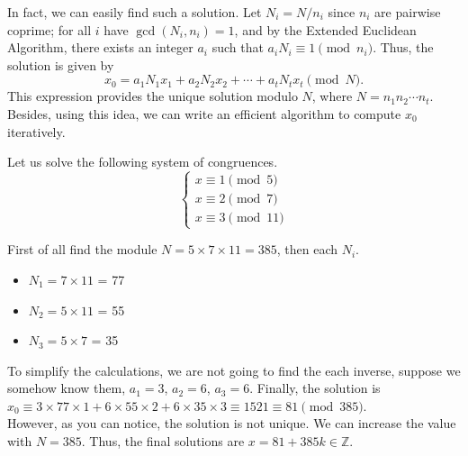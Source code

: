 \documentclass[../lecture-notes-148x210.tex]{subfiles}
\begin{document}
In fact, we can easily find such a solution. Let $N_i = N/n_i$ since $n_i$ are pairwise coprime; 
for all $i$ have $\gcd(N_i, n_i) = 1$, and by the Extended Euclidean Algorithm, there exists an integer
$a_i$ such that $a_iN_i \equiv 1 \pmod{n_i}$. Thus, the solution is given by 
\begin{equation*}
    x_0 = a_1N_1x_1 + a_2N_2x_2 + \cdots + a_tN_tx_t \pmod{N}.
\end{equation*}
This expression provides the unique solution modulo $N$, where $N = n_1 n_2 \cdots n_t$. 
Besides, using this idea, we can write an efficient algorithm to compute $x_0$ iteratively.

\begin{example}
    Let us solve the following system of congruences.
    \begin{equation*}    
        \begin{cases}
            x \equiv 1 \pmod{5} \\
            x \equiv 2 \pmod{7} \\
            x \equiv 3 \pmod{11}
        \end{cases}
    \end{equation*}

    First of all find the module $N = 5 \times 7 \times 11 = 385$, then each $N_i$. \\
    \vspace{-7mm}
    \begin{multicols*}{2}    
        \begin{itemize}
            \item $N_1 = 7 \times 11$ = 77
            \item $N_2 = 5 \times 11$ = 55
            \item $N_3 = 5 \times 7$ = 35
        \end{itemize}
    \end{multicols*}
    \vspace{-3mm}

    To simplify the calculations, we are not going to find the each inverse, suppose 
    we somehow know them, $a_1 = 3$, $a_2 = 6$, $a_3 = 6$.
    Finally, the solution is $x_0 \equiv 3 \times 77 \times 1 + 6 \times 55 \times 2 + 6 \times 35 \times 3 \equiv 1521 \equiv 81 \pmod{385}$.
    \\
    
    However, as you can notice, the solution is not unique. We can increase the value with $N = 385$.
    Thus, the final solutions are $x = 81 + 385k \in \mathbb{Z}$.

\end{example}
\end{document}

